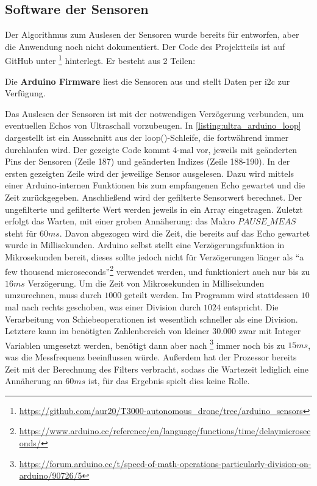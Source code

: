 \subsection{Software der Sensoren}\label{chap:arduino_sensors}
Der Algorithmus zum Auslesen der Sensoren wurde bereits für \cite[Kapitel 4.4]{markusreinErweiterungBestehenderDrohnen2023} entworfen, aber die Anwendung noch nicht dokumentiert. Der Code des Projektteils ist auf GitHub unter \footnote{\url{https://github.com/aur20/T3000-autonomous_drone/tree/arduino_sensors}} hinterlegt. Er besteht aus 2 Teilen:

Die \textbf{\large Arduino Firmware} liest die Sensoren aus und stellt Daten per \gls{i2c} zur Verfügung.

Das Auslesen der Sensoren ist mit der notwendigen Verzögerung verbunden, um eventuellen Echos von Ultraschall vorzubeugen. In \ref{listing:ultra_arduino_loop} dargestellt ist ein Ausschnitt aus der loop()-Schleife, die fortwährend immer durchlaufen wird. Der gezeigte Code kommt 4-mal vor, jeweils mit geänderten Pins der Sensoren (Zeile 187) und geänderten Indizes (Zeile 188-190). In der ersten gezeigten Zeile wird der jeweilige Sensor ausgelesen. Dazu wird mittels einer Arduino-internen Funktionen bis zum empfangenen Echo gewartet und die Zeit zurückgegeben. Anschließend wird der gefilterte Sensorwert berechnet. Der ungefilterte und gefilterte Wert werden jeweils in ein Array eingetragen. Zuletzt erfolgt das Warten, mit einer groben Annäherung: das Makro $PAUSE\_MEAS$ steht für $60ms$. Davon abgezogen wird die Zeit, die bereits auf das Echo gewartet wurde in Millisekunden. Arduino selbst stellt eine Verzögerungsfunktion in Mikrosekunden bereit, dieses sollte jedoch nicht für Verzögerungen länger als \enquote{a few thousend microseconds}\footnote{\url{https://www.arduino.cc/reference/en/language/functions/time/delaymicroseconds/}} verwendet werden, und funktioniert auch nur bis zu $16ms$ Verzögerung. Um die Zeit von Mikrosekunden in Millisekunden umzurechnen, muss durch $1000$ geteilt werden. Im Programm wird stattdessen $10$ mal nach rechts geschoben, was einer Division durch $1024$ entspricht. Die Verarbeitung von Schiebeoperationen ist wesentlich schneller als eine Division. Letztere kann im benötigten Zahlenbereich von kleiner $30.000$ zwar mit Integer Variablen umgesetzt werden, benötigt dann aber nach \footnote{\url{https://forum.arduino.cc/t/speed-of-math-operations-particularly-division-on-arduino/90726/5}} immer noch bis zu $15ms$, was die Messfrequenz beeinflussen würde. Außerdem hat der Prozessor bereits Zeit mit der Berechnung des Filters verbracht, sodass die Wartezeit lediglich eine Annäherung an $60ms$ ist, für das Ergebnis spielt dies keine Rolle.  

